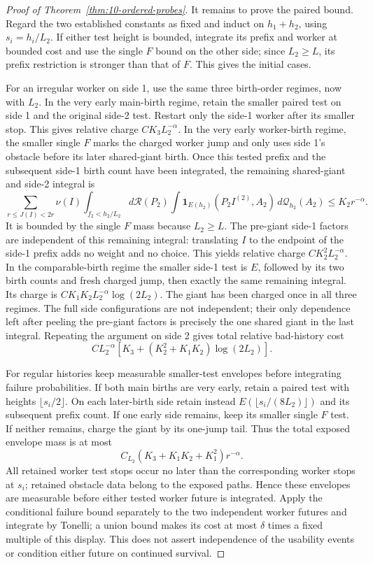 \begin{proof}[Proof of Theorem~\ref{thm:10-ordered-probes}]
It remains to prove the paired bound. Regard the two established
constants as fixed and induct on \(h_1+h_2\), using
\(s_i=h_i/L_2\). If either test height is bounded, integrate its prefix
and worker at bounded cost and use the single \(F\) bound on the other
side; since \(L_2\ge L\), its prefix restriction is stronger than that
of \(F\). This gives the initial cases.

For an irregular worker on side 1, use the same three birth-order
regimes, now with \(L_2\). In the very early main-birth regime, retain
the smaller paired test on side 1 and the original side-2 test. Restart
only the side-1 worker after its smaller stop. This gives relative charge
\(CK_3L_2^{-\alpha}\). In the very early worker-birth regime, the
smaller single \(F\) marks the charged worker jump and only uses side
1's obstacle before its later shared-giant birth. Once this tested
prefix and the subsequent side-1 birth count have been integrated, the
remaining shared-giant and side-2 integral is
\[
 \sum_{r\le J(I)<2r}\nu(I)
 \int_{f_2<h_2/L_2}\!d\mathcal R(P_2)
 \int\mathbf1_{E(h_2)}(P_2I^{(2)},A_2)\,d\mathcal Q_{h_2}(A_2)
 \le K_2r^{-\alpha}.
\]
It is bounded by the single \(F\) mass because \(L_2\ge L\). The
pre-giant side-1 factors are independent of this remaining integral:
translating \(I\) to the endpoint of the side-1 prefix adds no weight
and no choice. This yields relative charge \(CK_2^2L_2^{-\alpha}\).
In the comparable-birth regime the smaller side-1 test is \(E\), followed
by its two birth counts and fresh charged jump, then exactly the same
remaining integral. Its charge is
\(CK_1K_2L_2^{-\alpha}\log(2L_2)\).
The giant has been charged once in all three regimes. The full side
configurations are not independent; their only dependence left after
peeling the pre-giant factors is precisely the one shared giant in the
last integral. Repeating the argument on side 2 gives total relative
bad-history cost
\[
 CL_2^{-\alpha}
       [K_3+(K_2^2+K_1K_2)\log(2L_2)].
\]

For regular histories keep measurable smaller-test envelopes before
integrating failure probabilities. If both main births are very early,
retain a paired test with heights \(\lfloor s_i/2\rfloor\). On each
later-birth side retain instead
\(E(\lfloor s_i/(8L_2)\rfloor)\) and its subsequent prefix count.
If one early side remains, keep its smaller single \(F\) test. If
neither remains, charge the giant by its one-jump tail. Thus the total
exposed envelope mass is at most
\[
 C_{L_2}(K_3+K_1K_2+K_1^2)r^{-\alpha}.
\]
All retained worker test stops occur no later than the corresponding
worker stops at \(s_i\); retained obstacle data belong to the exposed
paths. Hence these envelopes are measurable before either tested
worker future is integrated. Apply the conditional failure bound
separately to the two independent worker futures and integrate by
Tonelli; a union bound makes its cost at most \(\delta\) times a fixed
multiple of this display. This does not assert independence of the
usability events or condition either future on continued survival.


\end{proof}
